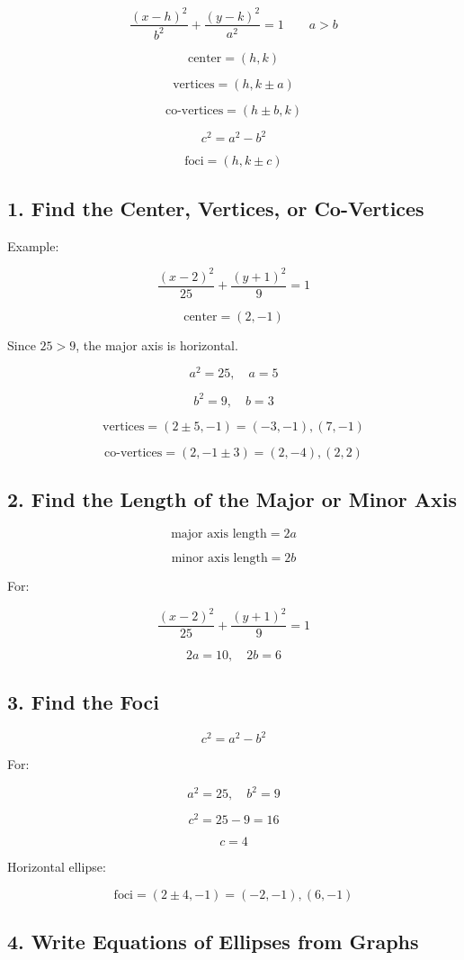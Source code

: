\documentclass[11pt]{article}
\begin{document}
\[
\frac{(x-h)^2}{b^2}+\frac{(y-k)^2}{a^2}=1
\qquad
a>b
\]

\[
\text{center}=(h,k)
\]

\[
\text{vertices}=(h,k\pm a)
\]

\[
\text{co-vertices}=(h\pm b,k)
\]

\[
c^2=a^2-b^2
\]

\[
\text{foci}=(h,k\pm c)
\]

\subsection*{1. Find the Center, Vertices, or Co-Vertices}

Example:

\[
\frac{(x-2)^2}{25}+\frac{(y+1)^2}{9}=1
\]

\[
\text{center}=(2,-1)
\]

Since \(25>9\), the major axis is horizontal.

\[
a^2=25,\quad a=5
\]

\[
b^2=9,\quad b=3
\]

\[
\text{vertices}=(2\pm5,-1)=(-3,-1),(7,-1)
\]

\[
\text{co-vertices}=(2,-1\pm3)=(2,-4),(2,2)
\]

\subsection*{2. Find the Length of the Major or Minor Axis}

\[
\text{major axis length}=2a
\]

\[
\text{minor axis length}=2b
\]

For:

\[
\frac{(x-2)^2}{25}+\frac{(y+1)^2}{9}=1
\]

\[
2a=10,\quad 2b=6
\]

\subsection*{3. Find the Foci}

\[
c^2=a^2-b^2
\]

For:

\[
a^2=25,\quad b^2=9
\]

\[
c^2=25-9=16
\]

\[
c=4
\]

Horizontal ellipse:

\[
\text{foci}=(2\pm4,-1)=(-2,-1),(6,-1)
\]

\subsection*{4. Write Equations of Ellipses from Graphs}
\end{document}
